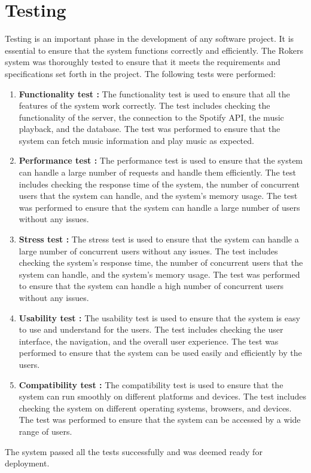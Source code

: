 \chapter{Testing}

Testing is an important phase in the development of any software project. It is essential to ensure that the system functions correctly and efficiently. The Rokers system was thoroughly tested to ensure that it meets the requirements and specifications set forth in the project. The following tests were performed:
\begin{enumerate}
    \item \textbf{Functionality test :} The functionality test is used to ensure that all the features of the system work correctly. The test includes checking the functionality of the server, the connection to the Spotify API, the music playback, and the database. The test was performed to ensure that the system can fetch music information and play music as expected.
    \item \textbf{Performance test :} The performance test is used to ensure that the system can handle a large number of requests and handle them efficiently. The test includes checking the response time of the system, the number of concurrent users that the system can handle, and the system's memory usage. The test was performed to ensure that the system can handle a large number of users without any issues.
    \item \textbf{Stress test :} The stress test is used to ensure that the system can handle a large number of concurrent users without any issues. The test includes checking the system's response time, the number of concurrent users that the system can handle, and the system's memory usage. The test was performed to ensure that the system can handle a high number of concurrent users without any issues.
    \item \textbf{Usability test :} The usability test is used to ensure that the system is easy to use and understand for the users. The test includes checking the user interface, the navigation, and the overall user experience. The test was performed to ensure that the system can be used easily and efficiently by the users.
    \item \textbf{Compatibility test :} The compatibility test is used to ensure that the system can run smoothly on different platforms and devices. The test includes checking the system on different operating systems, browsers, and devices. The test was performed to ensure that the system can be accessed by a wide range of users.
    
\end{enumerate}

The system passed all the tests successfully and was deemed ready for deployment.









